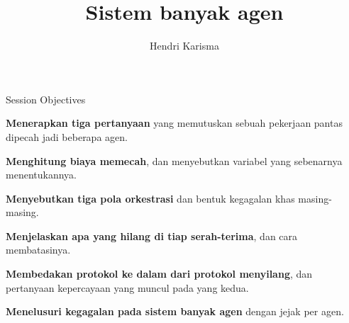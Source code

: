 \documentclass[aspectratio=169,11pt,t]{beamer}
\title{Sistem banyak agen}
\author{Hendri Karisma}
\date{}
\begin{document}
\covertitle

\begin{frame}[shrink=25]{Session Objectives}
\begin{isteps}
\item \textbf{Menerapkan tiga pertanyaan} yang memutuskan sebuah pekerjaan pantas dipecah jadi beberapa agen.
\item \textbf{Menghitung biaya memecah}, dan menyebutkan variabel yang sebenarnya menentukannya.
\item \textbf{Menyebutkan tiga pola orkestrasi} dan bentuk kegagalan khas masing-masing.
\item \textbf{Menjelaskan apa yang hilang di tiap serah-terima}, dan cara membatasinya.
\item \textbf{Membedakan protokol ke dalam dari protokol menyilang}, dan pertanyaan kepercayaan yang muncul pada yang kedua.
\item \textbf{Menelusuri kegagalan pada sistem banyak agen} dengan jejak per agen.
\end{isteps}

\vskip 6pt
\vskip 4pt
\vskip 2pt
\end{frame}

\end{document}
